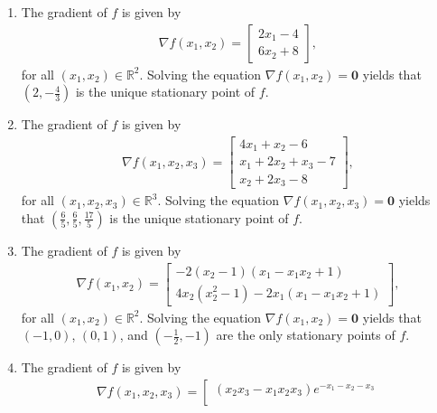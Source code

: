 \documentclass[a4paper]{article}
\numberwithin{equation}{section}
\begin{document}
\begin{enumerate}
\item The gradient of $f$ is given by 
\begin{align}
\nabla f\left( {{x_1},{x_2}} \right) = \left[ {\begin{array}{*{20}{c}}
{2{x_1} - 4}\\
{6{x_2} + 8}
\end{array}} \right],
\end{align}
for all $\left(x_1,x_2\right) \in \mathbb{R}^2$. Solving the equation $\nabla f\left( {{x_1},{x_2}} \right) = \mathbf{0}$ yields that $\left(2,-\frac{4}{3}\right)$ is the unique stationary point of $f$.
\item The gradient of $f$ is given by 
\begin{align}
\nabla f\left( {{x_1},{x_2},{x_3}} \right) = \left[ {\begin{array}{*{20}{c}}
{4{x_1} + {x_2} - 6}\\
{{x_1} + 2{x_2} + {x_3} - 7}\\
{{x_2} + 2{x_3} - 8}
\end{array}} \right] ,
\end{align}
for all $\left(x_1,x_2,x_3\right) \in \mathbb{R}^3$. Solving the equation $\nabla f\left( {{x_1},{x_2},{x_3}} \right) = \mathbf{0}$ yields that $\left(\frac{6}{5},\frac{6}{5},\frac{17}{5}\right)$ is the unique stationary point of $f$.
\item The gradient of $f$ is given by
\begin{align}
\nabla f\left( {{x_1},{x_2}} \right) = \left[ {\begin{array}{*{20}{c}}
{ - 2\left( {{x_2} - 1} \right)\left( {{x_1} - {x_1}{x_2} + 1} \right)}\\
{4{x_2}\left( {x_2^2 - 1} \right) - 2{x_1}\left( {{x_1} - {x_1}{x_2} + 1} \right)}
\end{array}} \right],
\end{align}
for all $\left(x_1,x_2\right) \in \mathbb{R}^2$. Solving the equation $\nabla f\left( {{x_1},{x_2}} \right) = \mathbf{0}$ yields that $\left(-1,0\right)$, $\left(0,1\right)$, and $\left(-\frac{1}{2},-1\right)$ are the only stationary points of $f$.
\item The gradient of $f$ is given by
\begin{align}
\nabla f\left( {{x_1},{x_2},{x_3}} \right) = \left[ {\begin{array}{*{20}{c}}
{\left( {{x_2}{x_3} - {x_1}{x_2}{x_3}} \right){e^{ - {x_1} - {x_2} - {x_3}}}}\\

\end{array}}
\end{align}
\end{enumerate}
\end{document}
